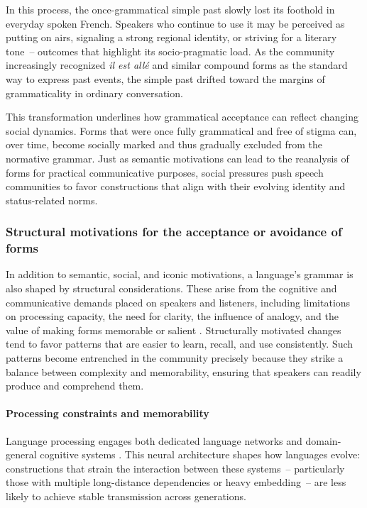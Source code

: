 In this process, the once-grammatical simple past slowly lost its foothold in everyday spoken French. Speakers who continue to use it may be perceived as putting on airs, signaling a strong regional identity, or striving for a literary tone~-- outcomes that highlight its socio-pragmatic load. As the community increasingly recognized \textit{il est allé} and similar compound forms as the standard way to express past events, the simple past drifted toward the margins of grammaticality in ordinary conversation.

This transformation underlines how grammatical acceptance can reflect changing social dynamics. Forms that were once fully grammatical and free of stigma can, over time, become socially marked and thus gradually excluded from the normative grammar. Just as semantic motivations can lead to the reanalysis of forms for practical communicative purposes, social pressures push speech communities to favor constructions that align with their evolving identity and status-related norms.

\subsubsection{Structural motivations for the acceptance or avoidance of forms}\label{subsec:structural-motivations}

In addition to semantic, social, and iconic motivations, a language’s grammar is also shaped by structural considerations. These arise from the cognitive and communicative demands placed on speakers and listeners, including limitations on processing capacity, the need for clarity, the influence of analogy, and the value of making forms memorable or salient \autocite{wurzel1989}. Structurally motivated changes tend to favor patterns that are easier to learn, recall, and use consistently. Such patterns become entrenched in the community precisely because they strike a balance between complexity and memorability, ensuring that speakers can readily produce and comprehend them.

\paragraph{Processing constraints and memorability}\label{sec:processing}
Language processing engages both dedicated language networks and domain-general cognitive systems \autocite{Fedorenko2024}. This neural architecture shapes how languages evolve: constructions that strain the interaction between these systems~-- particularly those with multiple long-distance dependencies or heavy embedding~-- are less likely to achieve stable transmission across generations.

